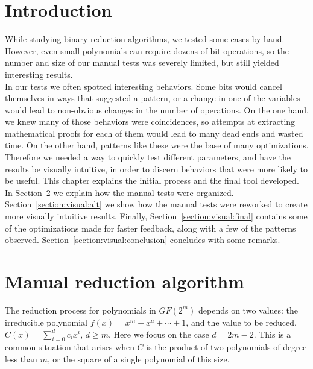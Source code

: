 \section{Introduction}

While studying binary reduction algorithms, we tested some cases by hand. However, even small polynomials can require dozens of bit operations, so the number and size of our manual tests was severely limited, but still yielded interesting results. \\

In our tests we often spotted interesting behaviors. Some bits would cancel themselves in ways that suggested a pattern, or a change in one of the variables would lead to non-obvious changes in the number of operations. On the one hand, we knew many of those behaviors were coincidences, so attempts at extracting mathematical proofs for each of them would lead to many dead ends and wasted time. On the other hand, patterns like these were the base of many optimizations. \\

Therefore we needed a way to quickly test different parameters, and have the results be visually intuitive, in order to discern behaviors that were more likely to be useful. This chapter explains the initial process and the final tool developed. In Section~\ref{section:visual:manual} we explain how the manual tests were organized. Section~\ref{section:visual:alt} we show how the manual tests were reworked to create more visually intuitive results. Finally, Section~\ref{section:visual:final} contains some of the optimizations made for faster feedback, along with a few of the patterns observed. Section~\ref{section:visual:conclusion} concludes with some remarks. \\

\section{Manual reduction algorithm} \label{section:visual:manual}

The reduction process for polynomials in $GF(2^m)$ depends on two values: the irreducible polynomial $f(x) = x^m + x^a + \cdots + 1$, and the value to be reduced, $C(x) = \sum_{i=0}^{d} c_i x^i$, $d \geq m$. Here we focus on the case $d=2m-2$. This is a common situation that arises when $C$ is the product of two polynomials of degree less than $m$, or the square of a single polynomial of this size. \\


